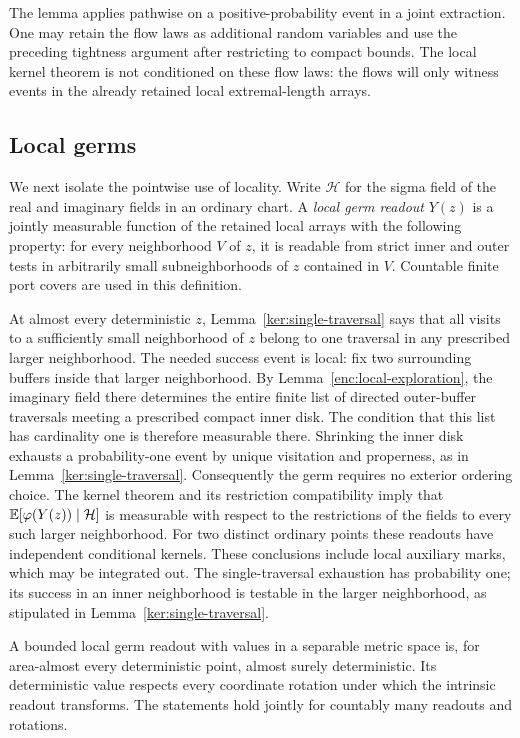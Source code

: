 The lemma applies pathwise on a positive-probability event in a joint
extraction.  One may retain the flow laws as additional random
variables and use the preceding tightness argument after restricting
to compact bounds.  The local kernel theorem is not conditioned on
these flow laws: the flows will only witness events in the already
retained local extremal-length arrays.

\subsection{Local germs}
\label{conf:germ-subsection}

We next isolate the pointwise use of locality.  Write
\(\mathcal H\) for the sigma field of the real and imaginary fields
in an ordinary chart.  A \emph{local germ readout} \(Y(z)\) is a
jointly measurable function of the retained local arrays with the
following property: for every neighborhood \(V\) of \(z\), it is
readable from strict inner and outer tests in arbitrarily small
subneighborhoods of \(z\) contained in \(V\).  Countable finite
port covers are used in this definition.

At almost every deterministic \(z\), Lemma~\ref{ker:single-traversal}
says that all visits to a sufficiently small neighborhood of \(z\)
belong to one traversal in any prescribed larger neighborhood.
The needed success event is local: fix two surrounding buffers inside
that larger neighborhood. By Lemma~\ref{enc:local-exploration}, the
imaginary field there determines the entire finite list of directed
outer-buffer traversals meeting a prescribed compact inner disk. The
condition that this list has cardinality one is therefore measurable
there. Shrinking the inner disk exhausts a probability-one event by
unique visitation and properness, as in Lemma~\ref{ker:single-traversal}.
Consequently the germ requires no exterior ordering choice. The
kernel theorem and its restriction compatibility imply that
\(\mathbb E[\varphi(Y(z))\mid\mathcal H]\) is measurable with respect
to the restrictions of the fields to every such larger neighborhood.
For two distinct ordinary points these readouts have independent
conditional kernels.  These conclusions include local auxiliary marks,
which may be integrated out.  The single-traversal exhaustion has
probability one; its success in an inner neighborhood is testable in
the larger neighborhood, as stipulated in
Lemma~\ref{ker:single-traversal}.

\begin{lemma}
\label{conf:germs}
A bounded local germ readout with values in a separable metric space
is, for area-almost every deterministic point, almost surely
deterministic.  Its deterministic value respects every coordinate
rotation under which the intrinsic readout transforms.  The statements
hold jointly for countably many readouts and rotations.
\end{lemma}

